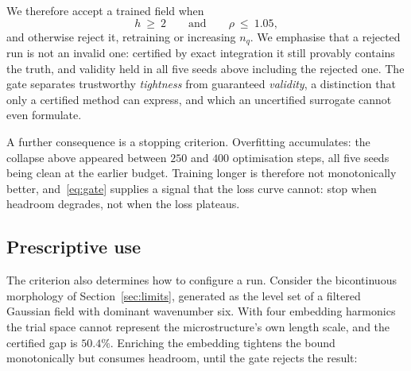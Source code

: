 We therefore accept a trained field when
%
\begin{equation}
  h \ \ge\ 2 \qquad\text{and}\qquad \rho \ \le\ 1.05 ,
  \label{eq:gate}
\end{equation}
%
and otherwise reject it, retraining or increasing $n_q$. We emphasise that
a rejected run is not an invalid one: certified by exact integration it
still provably contains the truth, and validity held in all five seeds
above including the rejected one. The gate separates trustworthy
\emph{tightness} from guaranteed \emph{validity}, a distinction that only
a certified method can express, and which an uncertified surrogate cannot
even formulate.

A further consequence is a stopping criterion. Overfitting accumulates: the
collapse above appeared between $250$ and $400$ optimisation steps, all
five seeds being clean at the earlier budget. Training longer is therefore
not monotonically better, and~\eqref{eq:gate} supplies a signal that the loss curve cannot: stop when headroom degrades, not when the loss
plateaus.

\subsection{Prescriptive use}
\label{sec:quad:prescription}

The criterion also determines how to configure a run. Consider the
bicontinuous morphology of Section~\ref{sec:limits}, generated as the level
set of a filtered Gaussian field with dominant wavenumber six. With four
embedding harmonics the trial space cannot represent the microstructure's
own length scale, and the certified gap is $50.4\%$. Enriching the
embedding tightens the bound monotonically but consumes headroom, until the
gate rejects the result:

\begin{table}[t]
\centering
\caption{Trial-space richness and quadrature resolution are coupled
requirements. Bicontinuous morphology, contrast $10$.}
\label{tab:prescription}

\end{table}

